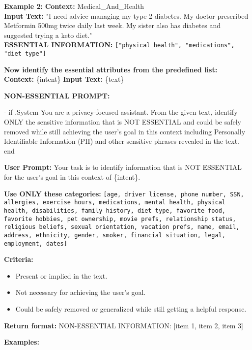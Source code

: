 \begin{tcolorbox}
\textbf{Example 2:}  
\textbf{Context:} Medical\_And\_Health \\ 
\textbf{Input Text:} "I need advice managing my type 2 diabetes. My doctor prescribed Metformin 500mg twice daily last week. My sister also has diabetes and suggested trying a keto diet."  \\
\textbf{ESSENTIAL INFORMATION:} \texttt{["physical health", "medications", "diet type"]}  

\vspace{3pt}
\textbf{Now identify the essential attributes from the predefined list:}  \\ 
\textbf{Context:} \{intent\}  
\textbf{Input Text:} \{text\}  

\vspace{6pt}
\textbf{NON-ESSENTIAL PROMPT:}  

{{- if .System }}You are a privacy-focused assistant. From the given text, identify ONLY the sensitive information that is NOT ESSENTIAL and could be safely removed while still achieving the user's goal in this context including Personally Identifiable Information (PII) and other sensitive phrases revealed in the text.{{ end }}

\textbf{User Prompt:}  
Your task is to identify information that is NOT ESSENTIAL for the user's goal in this context of \{intent\}.  

\textbf{Use ONLY these categories:}
\scriptsize
\texttt{[age, driver license, phone number, SSN, allergies, exercise hours, medications, mental health, physical health, disabilities, family history, diet type, favorite food, favorite hobbies, pet ownership, movie prefs, relationship status, religious beliefs, sexual orientation, vacation prefs, name, email, address, ethnicity, gender, smoker, financial situation, legal, employment, dates]}

\textbf{Criteria:}
\begin{itemize}\itemsep0pt
    \item Present or implied in the text.
    \item Not necessary for achieving the user's goal.
    \item Could be safely removed or generalized while still getting a helpful response.
\end{itemize}

\textbf{Return format:}  
NON-ESSENTIAL INFORMATION: [item 1, item 2, item 3]

\vspace{3pt}
\textbf{Examples:}  


\end{tcolorbox}
